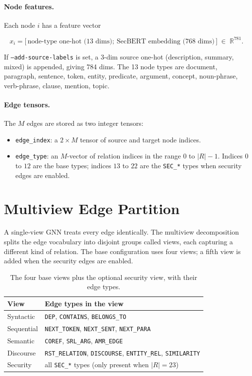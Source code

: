 \documentclass[11pt]{article}
\begin{document}
\paragraph{Node features.}
Each node $i$ has a feature vector

\[
x_i = \bigl[\,\text{node-type one-hot (13 dims)};\
              \text{SecBERT embedding (768 dims)}\,\bigr]
\;\in\; \mathbb{R}^{781}.
\]

If \texttt{--add-source-labels} is set, a 3-dim source one-hot
(description, summary, mixed) is appended, giving 784 dims. The 13
node types are document, paragraph, sentence, token, entity,
predicate, argument, concept, noun-phrase, verb-phrase, clause,
mention, topic.

\paragraph{Edge tensors.}
The $M$ edges are stored as two integer tensors:

\begin{itemize}
    \item \texttt{edge\_index}: a $2 \times M$ tensor of source and
    target node indices.
    \item \texttt{edge\_type}: an $M$-vector of relation indices in
    the range $0$ to $|R| - 1$. Indices $0$ to $12$ are the base
    types; indices $13$ to $22$ are the \texttt{SEC\_*} types when
    security edges are enabled.
\end{itemize}

\section{Multiview Edge Partition}

A single-view GNN treats every edge identically. The multiview
decomposition splits the edge vocabulary into disjoint groups called
views, each capturing a different kind of relation. The base
configuration uses four views; a fifth view is added when the
security edges are enabled.

\begin{table}[h]
\centering
\small
\begin{tabular}{ll}
\toprule
View & Edge types in the view \\
\midrule
Syntactic   & \texttt{DEP}, \texttt{CONTAINS}, \texttt{BELONGS\_TO} \\
Sequential  & \texttt{NEXT\_TOKEN}, \texttt{NEXT\_SENT}, \texttt{NEXT\_PARA} \\
Semantic    & \texttt{COREF}, \texttt{SRL\_ARG}, \texttt{AMR\_EDGE} \\
Discourse   & \texttt{RST\_RELATION}, \texttt{DISCOURSE}, \texttt{ENTITY\_REL}, \texttt{SIMILARITY} \\
Security    & all \texttt{SEC\_*} types (only present when $|R| = 23$) \\
\bottomrule
\end{tabular}
\caption{The four base views plus the optional security view, with
their edge types.}
\end{table}
\end{document}
